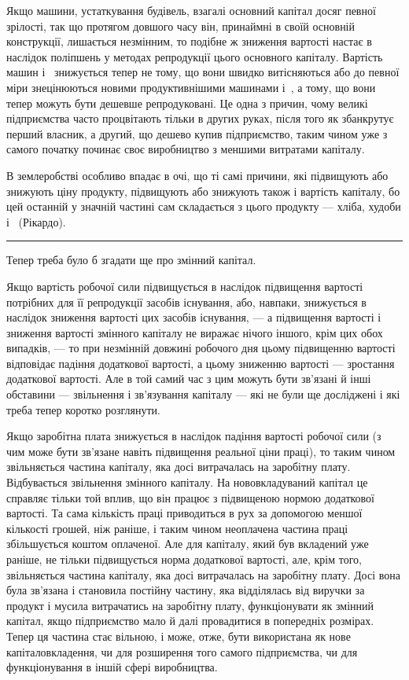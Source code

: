 Якщо машини, устаткування будівель, взагалі основний капітал досяг певної зрілості, так що протягом
довшого часу
він, принаймні в своїй основній конструкції, лишається незмінним, то подібне ж зниження вартості
настає в наслідок поліпшень
у методах репродукції цього основного капіталу. Вартість
машин і~ знижується тепер не тому, що вони швидко
витісняються або до певної міри знецінюються новими продуктивнішими
машинами і~, а тому, що вони тепер можуть
бути дешевше репродуковані. Це одна з причин, чому великі підприємства
часто процвітають тільки в других руках, після того
як збанкрутує перший власник, а другий, що дешево купив
підприємство, таким чином уже з самого початку починає своє
виробництво з меншими витратами капіталу.

В землеробстві особливо впадає в очі, що ті самі причини,
які підвищують або знижують ціну продукту, підвищують або
знижують також і вартість капіталу, бо цей останній у значній
частині сам складається з цього продукту — хліба, худоби і~
(Рікардо).

\pfbreak

Тепер треба було б згадати ще про змінний капітал.

Якщо вартість робочої сили підвищується в наслідок підвищення
вартості потрібних для її репродукції засобів існування,
або, навпаки, знижується в наслідок зниження вартості цих засобів
існування, — а підвищення вартості і зниження вартості
змінного капіталу не виражає нічого іншого, крім цих обох випадків, — то при незмінній довжині
робочого дня цьому підвищенню вартості відповідає падіння додаткової вартості, а цьому
зниженню вартості — зростання додаткової вартості. Але в той
самий час з цим можуть бути зв’язані й інші обставини — звільнення і зв’язування капіталу — які не
були ще досліджені і які
треба тепер коротко розглянути.

Якщо заробітна плата знижується в наслідок падіння вартості робочої сили (з чим може бути зв’язане
навіть підвищення
реальної ціни праці), то таким чином звільняється частина капіталу, яка досі витрачалась на
заробітну плату. Відбувається
звільнення змінного капіталу. На нововкладуваний капітал це
справляє тільки той вплив, що він працює з підвищеною нормою додаткової вартості. Та сама кількість
праці приводиться
в рух за допомогою меншої кількості грошей, ніж раніше, і таким чином неоплачена частина праці
збільшується коштом
оплаченої. Але для капіталу, який був вкладений уже раніше,
не тільки підвищується норма додаткової вартості, але, крім
того, звільняється частина капіталу, яка досі витрачалась на
заробітну плату. Досі вона була зв’язана і становила постійну
частину, яка відділялась від виручки за продукт і мусила витрачатись на заробітну плату,
функціонувати як змінний капітал,
якщо підприємство мало й далі провадитися в попередніх розмірах. Тепер ця частина стає вільною, і
може, отже, бути використана як нове капіталовкладення, чи для розширення того самого підприємства,
чи для функціонування в іншій сфері
виробництва.
